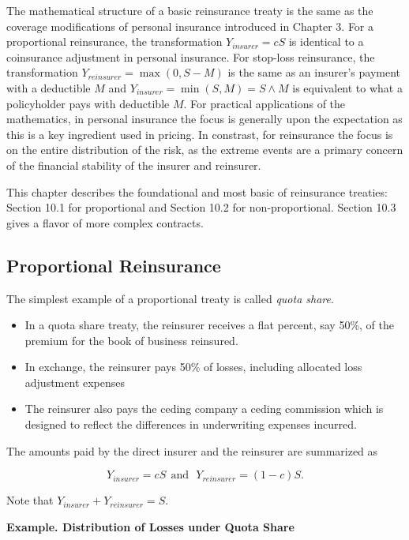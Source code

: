 \documentclass[]{book}
\theoremstyle{definition}
\theoremstyle{definition}
\theoremstyle{definition}
\theoremstyle{remark}
\begin{document}
The mathematical structure of a basic reinsurance treaty is the same as
the coverage modifications of personal insurance introduced in Chapter
3. For a proportional reinsurance, the transformation
\(Y_{insurer} = c S\) is identical to a coinsurance adjustment in
personal insurance. For stop-loss reinsurance, the transformation
\(Y_{reinsurer} = \max(0,S-M)\) is the same as an insurer's payment with
a deductible \(M\) and \(Y_{insurer} = \min(S,M) = S \wedge M\) is
equivalent to what a policyholder pays with deductible \(M\). For
practical applications of the mathematics, in personal insurance the
focus is generally upon the expectation as this is a key ingredient used
in pricing. In constrast, for reinsurance the focus is on the entire
distribution of the risk, as the extreme events are a primary concern of
the financial stability of the insurer and reinsurer.

This chapter describes the foundational and most basic of reinsurance
treaties: Section 10.1 for proportional and Section 10.2 for
non-proportional. Section 10.3 gives a flavor of more complex contracts.

\subsection{Proportional Reinsurance}\label{proportional-reinsurance}

The simplest example of a proportional treaty is called \emph{quota
share}.

\begin{itemize}
\item
  In a quota share treaty, the reinsurer receives a flat percent, say
  50\%, of the premium for the book of business reinsured.
\item
  In exchange, the reinsurer pays 50\% of losses, including allocated
  loss adjustment expenses
\item
  The reinsurer also pays the ceding company a ceding commission which
  is designed to reflect the differences in underwriting expenses
  incurred.
\end{itemize}

The amounts paid by the direct insurer and the reinsurer are summarized
as

\[
Y_{insurer} = c S \ \ \text{and} \ \ \ Y_{reinsurer} = (1-c) S.
\]

Note that \(Y_{insurer}+Y_{reinsurer}=S\).

\textbf{Example. Distribution of Losses under Quota Share}
\end{document}
